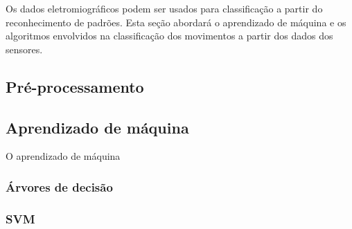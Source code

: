 Os dados eletromiográficos podem ser usados para classificação a partir do reconhecimento de padrões. Esta seção abordará o aprendizado de máquina e os algoritmos envolvidos na classificação dos movimentos a partir dos dados dos sensores.
\subsection{Pré-processamento}

\subsection{Aprendizado de máquina}
O aprendizado de máquina 
\subsubsection{Árvores de decisão}

\subsubsection{SVM}

